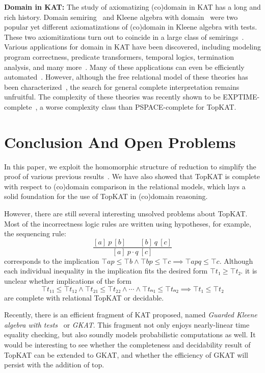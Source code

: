 \textbf{Domain in KAT:}
The study of axiomatizing (co)domain in KAT has a long and rich history. 
Domain semiring~\cite{Desharnais_Struth_2011} 
and Kleene algebra with domain~\cite{Desharnais_Möller_Struth_2006}
were two popular yet different axiomatizations of (co)domain in Kleene algebra with tests.
These two axiomitizations turn out to coincide in a large class of semirings~\cite{Fahrenberg_Johansen_Struth_Ziemiánski_2021}.
Various applications for domain in KAT have been discovered, including modeling
program correctness, predicate transformers, temporal logics, 
termination analysis, and many more~\cite{Desharnais_Möller_Struth_2004}.
Many of these applications can even be efficiently automated~\cite{hofner_AutomatedReasoningKleene_2007}.
However, although the free relational model of these theories has been characterized~\cite{mclean_FreeKleeneAlgebras_2020},
the search for general complete interpretation remains unfruitful.
The complexity of these theories was recently shown to be EXPTIME-complete~\cite{Sedlár_2023},
a worse complexity class than PSPACE-complete for TopKAT.



\section{Conclusion And Open Problems}

In this paper, we exploit the homomorphic structure of reduction
to simplify the proof of various previous results~\cite{Zhang_de_Amorim_Gaboardi_2022}.
We have also showed that TopKAT is complete with respect to (co)domain comparison
in the relational models,
which lays a solid foundation for the use of TopKAT in (co)domain reasoning.

However, there are still several interesting unsolved problems about TopKAT.
Most of the incorrectness logic rules are written using hypotheses,
for example, the sequencing rule:
\[
    \frac{[a]~p~[b] \qquad [b]~q~[c]}{[a]~p ⋅ q~[c]}
\]
corresponds to the implication \(⊤ a p ≤ ⊤ b ∧ ⊤ b p ≤ ⊤ c ⟹ ⊤ a p q ≤ ⊤ c\).
Although each individual inequality in the implication fits the desired form \(⊤ t₁ ≥ ⊤ t₂\).
it is unclear whether implications of the form
\[⊤ t₁₁ ≤ ⊤ t₁₂ ∧ ⊤ t₂₁ ≤ ⊤ t₂₂ ∧ ⋯ ∧ ⊤ tₙ₁ ≤ ⊤ tₙ₂ ⟹ ⊤ t₁ ≤ ⊤ t₂\]
are complete with relational TopKAT or decidable.

Recently, there is an efficient fragment of KAT proposed, named 
\emph{Guarded Kleene algebra with tests}~\cite{Smolka_Foster_Hsu_Kappé_Kozen_Silva_2020}
or \emph{GKAT}.
This fragment not only enjoys nearly-linear time equality checking,
but also soundly models probabilistic computations as well. 
It would be interesting to see whether the completeness and decidability result of TopKAT
can be extended to GKAT, and whether the efficiency of GKAT will persist with the addition of top.


